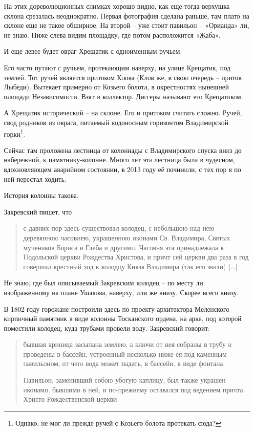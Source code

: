 На этих дореволюционных снимках хорошо видно, как еще тогда верхушка склона срезалась неоднократно. Первая фотография сделана раньше, там плато на склоне еще не такое обширное. На второй – уже стоит павильон – «Орианда» ли, не знаю. Ниже слева видим площадку, где потом расположится «Жаба».

И еще левее будет овраг Хрещатик с одноименным ручьем. 

Его часто путают с ручьем, протекающим наверху, на улице Крещатик, под землей. Тот ручей является притоком Клова (Клов же, в свою очередь – приток Лыбеди). Вытекает примерно от Козьего болота, в окрестностях нынешней площади Независимости. Взят в коллектор. Диггеры называют его Крещатиком.

А Хрещатик исторический – на склоне. Его и притоком считать сложно. Ручей, свод родников из оврага, питаемый водоносным горизонтом Владимирской горки\footnote{Однако, не мог ли прежде ручей с Козьего болота протекать сюда?}.

Сейчас там проложена лестница от колоннады с Владимирского спуска вниз до набережной, к памятнику-колонне. Много лет эта лестница была в чудесном, вдохновляющем аварийном состоянии, в 2013 году её починили, с тех пор я по ней перестал ходить.

История колонны такова.

Закревский пишет, что

\begin{quotation}
с давних пор здесь существовал колодец, с небольшою над нею деревянною часовнею, украшенною иконами Св. Владимира, Святых мучеников Бориса и Глеба и другими. Часовня эта принадлежала к Подольской церкви Рождества Христова, и причт сей церкви два раза в год совершал крестный ход к колодцу Князя Владимира (так его звали) [...]
\end{quotation}

Не знаю, где был описываемый Закревским колодец – по месту ли изображенному на плане Ушакова, наверху, или же внизу. Скорее всего внизу.

В 1802 году горожане построили здесь по проекту архитектора Меленского кирпичный памятник в виде колонны Тосканского ордена, на арке, под которой поместили колодец, куда трубами провели воду. Закревский говорит:

\begin{quotation}
бывшая криница засыпана землею, а ключи от нея собраны в трубу и проведены в бассейн, устроенный несколько ниже ея под каменным павильоном, от чего вода может падать, в бассейн, в виде фонтана.

Павильон, заменивший собою убогую каплицу, был также украшен иконами, бывшими в ней, и по-прежнему оставался под ведением причта Христо-Рождественской церкви
\end{quotation}

